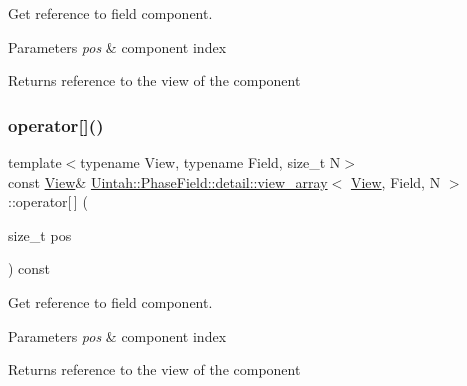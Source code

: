 Get reference to field component. 


\begin{DoxyParams}{Parameters}
{\em pos} & component index \\
\hline
\end{DoxyParams}
\begin{DoxyReturn}{Returns}
reference to the view of the component 
\end{DoxyReturn}
\mbox{\label{classUintah_1_1PhaseField_1_1detail_1_1view__array_a3f995548be07fb11a5db1cdd8cc7b6f4}} 
\subsubsection{\texorpdfstring{operator[]()}{operator[]()}\hspace{0.1cm}{\footnotesize\ttfamily [2/2]}}
{\footnotesize\ttfamily template$<$typename View, typename Field, size\+\_\+t N$>$ \\
const \hyperlink{namespaceUintah_1_1PhaseField_a59210a1e28eba254d428762c92ddeabb}{View}\& \hyperlink{classUintah_1_1PhaseField_1_1detail_1_1view__array}{Uintah\+::\+Phase\+Field\+::detail\+::view\+\_\+array}$<$ \hyperlink{namespaceUintah_1_1PhaseField_a59210a1e28eba254d428762c92ddeabb}{View}, Field, N $>$\+::operator\mbox{[}$\,$\mbox{]} (\begin{DoxyParamCaption}\item[{size\+\_\+t}]{pos }\end{DoxyParamCaption}) const\hspace{0.3cm}{\ttfamily [inline]}}



Get reference to field component. 


\begin{DoxyParams}{Parameters}
{\em pos} & component index \\
\hline
\end{DoxyParams}
\begin{DoxyReturn}{Returns}
reference to the view of the component 
\end{DoxyReturn}
\mbox{\label{classUintah_1_1PhaseField_1_1detail_1_1view__array_ac02634a707d1a4d12223a3af38a4cdbc}} 
